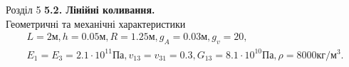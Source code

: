 \documentclass[8pt]{beamer}
\numberwithin{figure}{section}
\numberwithin{equation}{section}
\numberwithin{table}{section}
\begin{document}
\begin{frame}{Розділ 5}
\textbf{5.2. Лінійні коливання.}
\\
\vspace{1em}
Геометричні та механічні  характеристики
\begin{gather*}
L=2\text{м}, h=0.05\text{м},R=1.25\text{м},g_A=0.03\text{м}, g_v=20,\\
E_1=E_3=2.1\cdot 10^{11} Па, v_{13}=v_{31}=0.3, G_{13}=8.1\cdot 10^{10} Па, \rho=8000 кг/м^3.
\end{gather*}
\begin{table}[h!]
\centering
{}
\caption{Залежність найменшої власної частоти ($\omega$) від частоти гофрування ($g_v$) панелі}
\label{table:51}
\end{table}


\end{frame}
\end{document}
